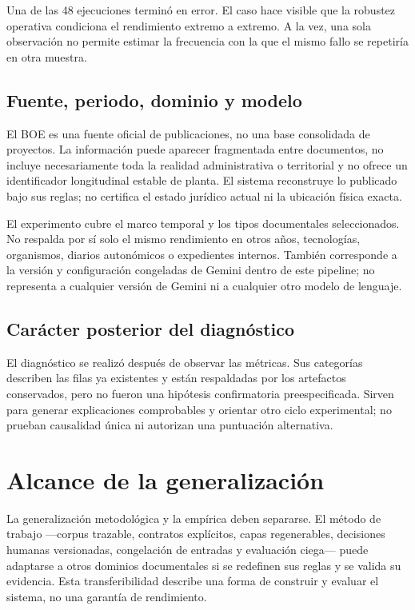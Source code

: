 Una de las 48 ejecuciones terminó en error. El caso hace visible que la robustez
operativa condiciona el rendimiento extremo a extremo. A la vez, una sola
observación no permite estimar la frecuencia con la que el mismo fallo se
repetiría en otra muestra.

\subsection{Fuente, periodo, dominio y modelo}
El BOE es una fuente oficial de publicaciones, no una base consolidada de
proyectos. La información puede aparecer fragmentada entre documentos, no
incluye necesariamente toda la realidad administrativa o territorial y no
ofrece un identificador longitudinal estable de planta. El sistema reconstruye
lo publicado bajo sus reglas; no certifica el estado jurídico actual ni la
ubicación física exacta.

El experimento cubre el marco temporal y los tipos documentales seleccionados.
No respalda por sí solo el mismo rendimiento en otros años, tecnologías,
organismos, diarios autonómicos o expedientes internos. También corresponde a
la versión y configuración congeladas de Gemini dentro de este pipeline; no
representa a cualquier versión de Gemini ni a cualquier otro modelo de lenguaje.

\subsection{Carácter posterior del diagnóstico}
El diagnóstico se realizó después de observar las métricas. Sus categorías
describen las filas ya existentes y están respaldadas por los artefactos
conservados, pero no fueron una hipótesis confirmatoria preespecificada. Sirven
para generar explicaciones comprobables y orientar otro ciclo experimental;
no prueban causalidad única ni autorizan una puntuación alternativa.

\section{Alcance de la generalización}
La generalización metodológica y la empírica deben separarse. El método de
trabajo ---corpus trazable, contratos explícitos, capas regenerables, decisiones
humanas versionadas, congelación de entradas y evaluación ciega--- puede
adaptarse a otros dominios documentales si se redefinen sus reglas y se valida
su evidencia. Esta transferibilidad describe una forma de construir y evaluar
el sistema, no una garantía de rendimiento.

